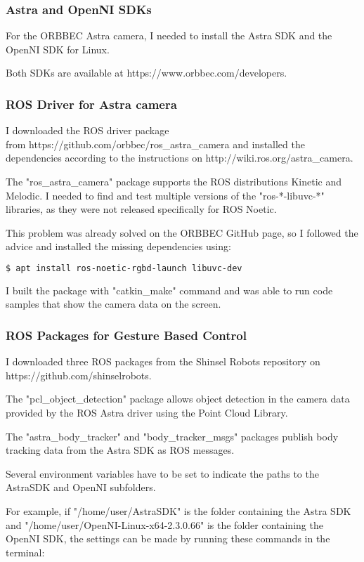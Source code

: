 \subsubsection{Astra and OpenNI SDKs}
For the ORBBEC Astra camera, I needed to install the Astra SDK and the OpenNI SDK for Linux.\par
Both SDKs are available at https://www.orbbec.com/developers.\par

\subsubsection{ROS Driver for Astra camera}
I downloaded the ROS driver package\\
from https://github.com/orbbec/ros\_astra\_camera and installed the dependencies according to the instructions on http://wiki.ros.org/astra\_camera.\par
The "ros\_astra\_camera" package supports the ROS distributions Kinetic and Melodic. I needed to find and test multiple versions of the "ros-*-libuvc-*" libraries, as they were not released specifically for ROS Noetic.\par
This problem was already solved on the ORBBEC GitHub page, so I followed the advice and installed the missing dependencies using:\par

\begin{lstlisting}[language=bash]
  $ apt install ros-noetic-rgbd-launch libuvc-dev
\end{lstlisting}


I built the package with "catkin\_make" command and was able to run code samples that show the camera data on the screen.\par

\subsubsection{ROS Packages for Gesture Based Control}
I downloaded three ROS packages from the Shinsel Robots repository on https://github.com/shinselrobots.\par
The "pcl\_object\_detection" package allows object detection in the camera data provided by the ROS Astra driver using the Point Cloud Library.\par
The "astra\_body\_tracker" and "body\_tracker\_msgs" packages publish body tracking data from the Astra SDK as ROS messages.\par
Several environment variables have to be set to indicate the paths to the AstraSDK and OpenNI subfolders.\par
For example, if "/home/user/AstraSDK" is the folder containing the Astra SDK and "/home/user/OpenNI-Linux-x64-2.3.0.66" is the folder containing the OpenNI SDK, the settings can be made by running these commands in the terminal: \par

